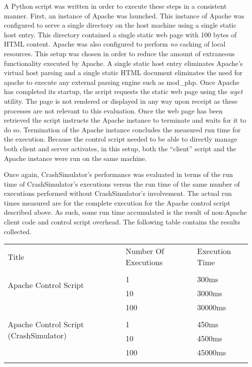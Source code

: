                 A Python script was written in order to execute these steps in a consistent manner. First, an instance
                of Apache was launched. This instance of Apache was configured to serve a single directory on the host
                machine using a single static host entry. This directory contained a single static web page with 100
                bytes of HTML content. Apache was also configured to perform \emph{no} caching of local resources. This
                setup was chosen in order to reduce the amount of extraneous functionality executed by Apache. A single
                static host entry eliminates Apache's virtual host parsing and a single static HTML document eliminates
                the need for apache to execute any external parsing engine such as mod\_php. Once Apache has completed
                its startup, the script requests the static web page using the \emph{wget} utility. The page is not
                rendered or displayed in any way upon receipt as these processes are not relevant to this evaluation.
                Once the web page has been retrieved the script instructs the Apache instance to terminate and waits for
                it to do so. Termination of the Apache instance concludes the measured run time for the execution.
                Because the control script needed to be able to directly manage both client and server activates, in
                this setup, both the ``client'' script and the Apache instance were run on the same machine.

                Once again, CrashSimulator's performance was evaluated in terms of the run time of CrashSimulator's
                executions versus the run time of the same number of executions performed without CrashSimulator's
                involvement. The actual run times measured are for the complete execution for the Apache control script
                described above. As such, some run time accumulated is the result of non-Apache client code and control
                script overhead. The following table contains the results collected.

                \begin{tabular}{l l l}
                    \toprule{}
                    Title & Number Of Executions & Execution Time \\
                    \multirow{3}{*}{Apache Control Script} \\
                    & 1 & 300ms \\
                    & 10 & 3000ms \\
                    & 100 & 30000ms \\
                    \multirow{3}{*}{Apache Control Script (CrashSimulator)} \\
                    & 1 & 450ms \\
                    & 10 & 4500ms \\
                    & 100 & 45000ms \\
                    \bottomrule{}
                \end{tabular}

